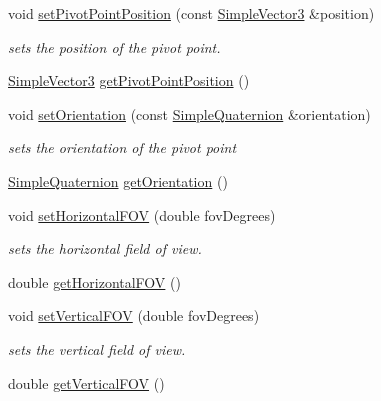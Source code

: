 \begin{DoxyCompactItemize}
void \hyperlink{classnext__best__view_1_1CameraModelFilter_a10a975639c9f9ebf9842741b1394026c}{set\-Pivot\-Point\-Position} (const \hyperlink{namespacenext__best__view_a59fc75b908e198bc02a9b19ba88edf12}{\-Simple\-Vector3} \&position)
\begin{DoxyCompactList}\small\item\em sets the position of the pivot point. \end{DoxyCompactList}\item 
\hyperlink{namespacenext__best__view_a59fc75b908e198bc02a9b19ba88edf12}{\-Simple\-Vector3} \hyperlink{classnext__best__view_1_1CameraModelFilter_a1350983ba32b8ae4e83403095363de43}{get\-Pivot\-Point\-Position} ()
\item 
void \hyperlink{classnext__best__view_1_1CameraModelFilter_a1c0d1eeeb45e854f34578caf04e3f4bb}{set\-Orientation} (const \hyperlink{namespacenext__best__view_a165f1f159539ff8e583fb7fe3620390c}{\-Simple\-Quaternion} \&orientation)
\begin{DoxyCompactList}\small\item\em sets the orientation of the pivot point \end{DoxyCompactList}\item 
\hyperlink{namespacenext__best__view_a165f1f159539ff8e583fb7fe3620390c}{\-Simple\-Quaternion} \hyperlink{classnext__best__view_1_1CameraModelFilter_a6db0dba10b55a0d501daa2b0a7fc7b16}{get\-Orientation} ()
\item 
void \hyperlink{classnext__best__view_1_1CameraModelFilter_a979831f7ccc9b2df46c276f17cec547d}{set\-Horizontal\-F\-O\-V} (double fov\-Degrees)
\begin{DoxyCompactList}\small\item\em sets the horizontal field of view. \end{DoxyCompactList}\item 
double \hyperlink{classnext__best__view_1_1CameraModelFilter_afd348d97365cc51c2b8f947897d4abcd}{get\-Horizontal\-F\-O\-V} ()
\item 
void \hyperlink{classnext__best__view_1_1CameraModelFilter_a0c7e8b10b31f02f1bf7120fdff31ac02}{set\-Vertical\-F\-O\-V} (double fov\-Degrees)
\begin{DoxyCompactList}\small\item\em sets the vertical field of view. \end{DoxyCompactList}\item 
double \hyperlink{classnext__best__view_1_1CameraModelFilter_a07a4f25b4a648946f6029c6effbecc31}{get\-Vertical\-F\-O\-V} ()
\item 

\end{DoxyCompactItemize}
